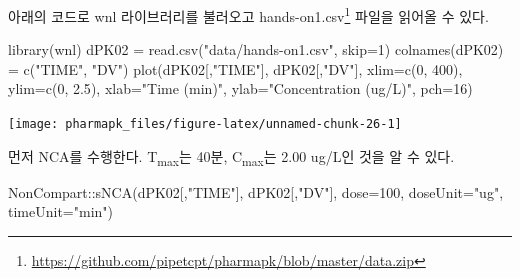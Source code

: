\documentclass[
  11pt,
  krantz2, a4paper, twoside]{krantz}
\newenvironment{Shaded}{\begin{snugshade}}{\end{snugshade}}
\newcommand{\AttributeTok}[1]{\textcolor[rgb]{0.77,0.63,0.00}{#1}}
\newcommand{\DecValTok}[1]{\textcolor[rgb]{0.00,0.00,0.81}{#1}}
\newcommand{\FloatTok}[1]{\textcolor[rgb]{0.00,0.00,0.81}{#1}}
\newcommand{\FunctionTok}[1]{\textcolor[rgb]{0.00,0.00,0.00}{#1}}
\newcommand{\NormalTok}[1]{#1}
\newcommand{\OtherTok}[1]{\textcolor[rgb]{0.56,0.35,0.01}{#1}}
\newcommand{\SpecialCharTok}[1]{\textcolor[rgb]{0.00,0.00,0.00}{#1}}
\newcommand{\StringTok}[1]{\textcolor[rgb]{0.31,0.60,0.02}{#1}}
\theoremstyle{definition}
\theoremstyle{definition}
\theoremstyle{definition}
\theoremstyle{definition}
\theoremstyle{remark}
\begin{document}
아래의 코드로 wnl 라이브러리를 불러오고 hands-on1.csv\footnote{\url{https://github.com/pipetcpt/pharmapk/blob/master/data.zip}} 파일을 읽어올 수 있다.

\begin{Shaded}
\begin{Highlighting}[]
\FunctionTok{library}\NormalTok{(wnl)}
\NormalTok{dPK02 }\OtherTok{=} \FunctionTok{read.csv}\NormalTok{(}\StringTok{"data/hands{-}on1.csv"}\NormalTok{, }\AttributeTok{skip=}\DecValTok{1}\NormalTok{)}
\FunctionTok{colnames}\NormalTok{(dPK02) }\OtherTok{=} \FunctionTok{c}\NormalTok{(}\StringTok{"TIME"}\NormalTok{, }\StringTok{"DV"}\NormalTok{)}
\FunctionTok{plot}\NormalTok{(dPK02[,}\StringTok{"TIME"}\NormalTok{], dPK02[,}\StringTok{"DV"}\NormalTok{], }\AttributeTok{xlim=}\FunctionTok{c}\NormalTok{(}\DecValTok{0}\NormalTok{, }\DecValTok{400}\NormalTok{), }\AttributeTok{ylim=}\FunctionTok{c}\NormalTok{(}\DecValTok{0}\NormalTok{, }\FloatTok{2.5}\NormalTok{), }
     \AttributeTok{xlab=}\StringTok{"Time (min)"}\NormalTok{, }\AttributeTok{ylab=}\StringTok{"Concentration (ug/L)"}\NormalTok{, }\AttributeTok{pch=}\DecValTok{16}\NormalTok{)}
\end{Highlighting}
\end{Shaded}

\begin{center}\texttt{[image: pharmapk\_files/figure-latex/unnamed-chunk-26-1]} \end{center}

먼저 NCA를 수행한다. T\textsubscript{max}는 40분, C\textsubscript{max}는 2.00 ug/L인 것을 알 수 있다.

\begin{Shaded}
\begin{Highlighting}[]
\NormalTok{NonCompart}\SpecialCharTok{::}\FunctionTok{sNCA}\NormalTok{(dPK02[,}\StringTok{"TIME"}\NormalTok{], dPK02[,}\StringTok{"DV"}\NormalTok{], }
                 \AttributeTok{dose=}\DecValTok{100}\NormalTok{, }\AttributeTok{doseUnit=}\StringTok{"ug"}\NormalTok{, }\AttributeTok{timeUnit=}\StringTok{"min"}\NormalTok{)}
\end{Highlighting}
\end{Shaded}
\end{document}
